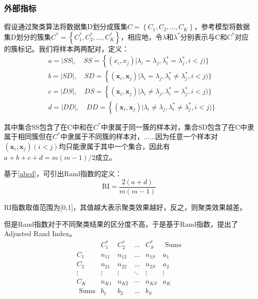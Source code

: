 \subsubsection{外部指标}
假设通过聚类算法将数据集D划分成簇集$C=\left\{C_1,C_2,...,C_K\right\}$，参考模型将数据集D划分的簇集$C^*=\left\{ C_{1}^{*},C_{2}^{*},...,C_{K}^{*} \right\} $，相应地，令$\lambda$和$\lambda^{*}$分别表示与C和$C^{*}$对应的簇标记。我们将样本两两配对，定义：
\begin{equation}
\label{abcd}
\begin{aligned}
&a=|S S|, \quad S S=\left\{(x_{i}, x_{j}) | \lambda_{i}=\lambda_{j}, \lambda_{i}^{*}=\lambda_{j}^{*}, i<j)\}\right.\\
&b=|S D|, \quad S D=\left\{(\boldsymbol{x}_{i}, \boldsymbol{x}_{j}) | \lambda_{i}=\lambda_{j}, \lambda_{i}^{*} \neq \lambda_{j}^{*}, i<j)\}\right.\\
&c=|D S|, \quad D S=\left\{(\boldsymbol{x}_{i}, \boldsymbol{x}_{j}) | \lambda_{i} \neq \lambda_{j}, \lambda_{i}^{*}=\lambda_{j}^{*}, i<j)\}\right.\\
&d=|D D|, \quad D D=\left\{(\boldsymbol{x}_{i}, \boldsymbol{x}_{j}) | \lambda_{i} \neq \lambda_{j}, \lambda_{i}^{*} \neq \lambda_{j}^{*}, i<j)\}\right.
\end{aligned}
\end{equation}

其中集合SS包含了在C中和在$C^{*}$中隶属于同一簇的样本对，集合SD包含了在C中隶属于相同簇但在$C^{*}$中隶属于不同簇的样本对，......因为任意一个样本对$\left(\boldsymbol{x}_{i}, \boldsymbol{x}_{j}\right)(i<j)$均只能隶属于其中一个集合，因此有$a+b+c+d=m(m-1) / 2$成立。

基于\ref{abcd}，可引出Rand指数的定义：
\begin{equation}
\label{RI}
\mathrm{RI}=\frac{2(a+d)}{m(m-1)}
\end{equation}

RI指数取值范围为[0,1]，其值越大表示聚类效果越好，反之，则聚类效果越差。

但是Rand指数对于不同聚类结果的区分度不高，于是基于Rand指数，提出了Adjusted Rand Index。
\[
\begin{array}{c|ccccc}
	&		C_{1}^{*}&		C_{2}^{*}&		\dots&		C_{S}^{*}&		\,\,\text{Sums}\\
	\hline
	C_1&		n_{11}&		n_{12}&		\dots&		n_{1S}&		a_1\\
	C_2&		n_{21}&		n_{22}&		\dots&		n_{2S}&		a_2\\
	\vdots&		\vdots&		\vdots&		\ddots&		\vdots&		\vdots\\
	C_K&		n_{K1}&		n_{K2}&		\cdots&		n_{KS}&		a_K\\
	\,\,\text{Sums}&		b_1&		b_2&		\dots&		b_S&		\\
\end{array}
\]

